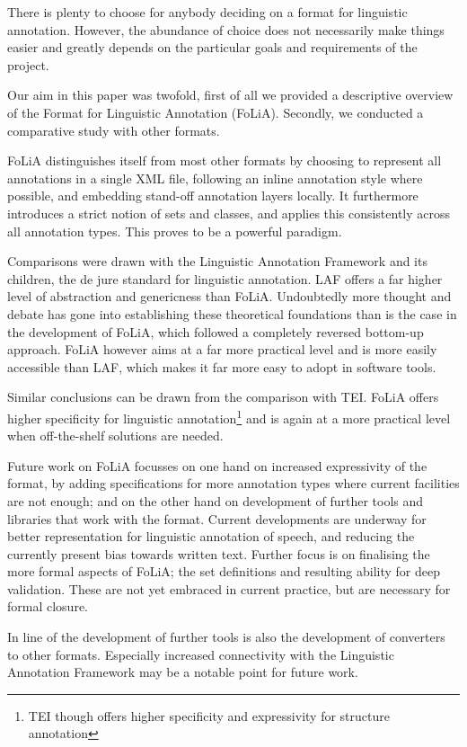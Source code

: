 \documentclass[a4paper,10pt,twoside]{article}
\begin{document}
There is plenty to choose for anybody deciding on a format for
linguistic annotation. However, the abundance of choice does not necessarily make
things easier and greatly depends on the particular goals and requirements of the
project.  

Our aim in this paper was twofold, first of all we provided a descriptive
overview of the Format for Linguistic Annotation (FoLiA). Secondly, we
conducted a comparative study with other formats.

FoLiA distinguishes itself from most other formats by choosing to represent
all annotations in a single XML file, following an inline annotation style where
possible, and embedding stand-off annotation layers locally. It furthermore
introduces a strict notion of sets and classes, and applies this consistently
across all annotation types. This proves to be a powerful paradigm.

Comparisons were drawn with the Linguistic Annotation Framework and its
children, the de jure standard for linguistic annotation. LAF offers a far
higher level of abstraction and genericness than FoLiA. Undoubtedly more
thought and debate has gone into establishing these theoretical foundations
than is the case in the development of FoLiA, which followed a completely
reversed bottom-up approach. FoLiA however aims at a far more practical level and is
more easily accessible than LAF, which makes it far more easy to adopt in
software tools.

Similar conclusions can be drawn from the comparison with TEI. FoLiA offers
higher specificity for linguistic annotation\footnote{TEI though offers higher
specificity and expressivity for structure annotation} and is again at a more
practical level when off-the-shelf solutions are needed.

Future work on FoLiA focusses on one hand on increased expressivity of the
format, by adding specifications for more annotation types where current
facilities are not enough; and on the other hand on development of further
tools and libraries that work with the format. Current developments are
underway for better representation for linguistic annotation of speech, and
reducing the currently present bias towards written text. Further focus is on
finalising the more formal aspects of FoLiA; the set definitions and resulting
ability for deep validation. These are not yet embraced in current practice,
but are necessary for formal closure.

In line of the development of further tools is also the development of
converters to other formats. Especially increased connectivity with the
Linguistic Annotation Framework may be a notable point for future work.

 
  
\end{document}
